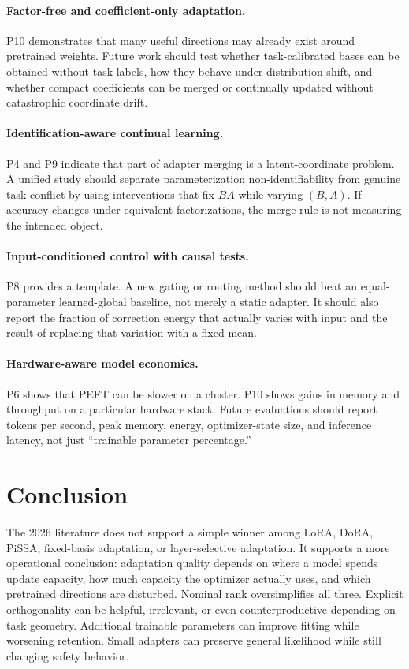 \documentclass[11pt]{article}
\begin{document}
\paragraph{Factor-free and coefficient-only adaptation.}
P10 demonstrates that many useful directions may already exist around pretrained weights. Future work should test whether task-calibrated bases can be obtained without task labels, how they behave under distribution shift, and whether compact coefficients can be merged or continually updated without catastrophic coordinate drift.

\paragraph{Identification-aware continual learning.}
P4 and P9 indicate that part of adapter merging is a latent-coordinate problem. A unified study should separate parameterization non-identifiability from genuine task conflict by using interventions that fix $BA$ while varying $(B,A)$. If accuracy changes under equivalent factorizations, the merge rule is not measuring the intended object.

\paragraph{Input-conditioned control with causal tests.}
P8 provides a template. A new gating or routing method should beat an equal-parameter learned-global baseline, not merely a static adapter. It should also report the fraction of correction energy that actually varies with input and the result of replacing that variation with a fixed mean.

\paragraph{Hardware-aware model economics.}
P6 shows that PEFT can be slower on a cluster. P10 shows gains in memory and throughput on a particular hardware stack. Future evaluations should report tokens per second, peak memory, energy, optimizer-state size, and inference latency, not just ``trainable parameter percentage.''

\section{Conclusion}

The 2026 literature does not support a simple winner among LoRA, DoRA, PiSSA, fixed-basis adaptation, or layer-selective adaptation. It supports a more operational conclusion: adaptation quality depends on where a model spends update capacity, how much capacity the optimizer actually uses, and which pretrained directions are disturbed. Nominal rank oversimplifies all three. Explicit orthogonality can be helpful, irrelevant, or even counterproductive depending on task geometry. Additional trainable parameters can improve fitting while worsening retention. Small adapters can preserve general likelihood while still changing safety behavior.
\end{document}
